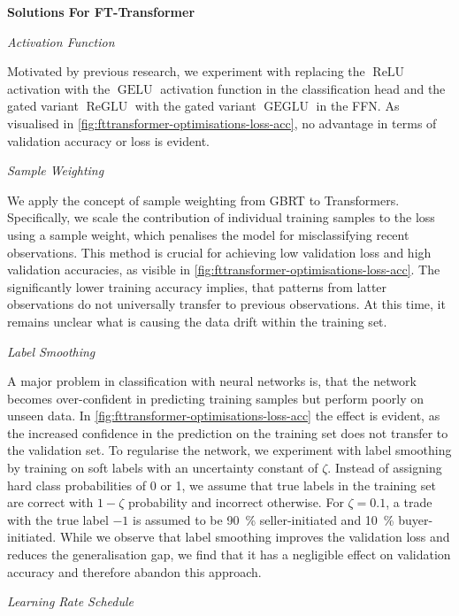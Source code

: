 \textbf{Solutions For FT-Transformer}

\emph{Activation Function}

Motivated by previous research, we experiment with replacing the $\operatorname{ReLU}$ activation with the $\operatorname{GELU}$ activation function \autocite[][2]{hendrycksGaussianErrorLinear2020} in the classification head and the gated variant $\operatorname{ReGLU}$ with the gated variant $\operatorname{GEGLU}$ \autocite[][2]{shazeerGLUVariantsImprove2020} in the \gls{FFN}. As visualised in \cref{fig:fttransformer-optimisations-loss-acc}, no advantage in terms of validation accuracy or loss is evident.

\emph{Sample Weighting}

We apply the concept of sample weighting from \gls{GBRT} to Transformers. Specifically, we scale the contribution of individual training samples to the loss using a sample weight, which penalises the model for misclassifying recent observations. This method is crucial for achieving low validation loss and high validation accuracies, as visible in \cref{fig:fttransformer-optimisations-loss-acc}. The significantly lower training accuracy implies, that patterns from latter observations do not universally transfer to previous observations. At this time, it remains unclear what is causing the data drift within the training set.

\emph{Label Smoothing}

A major problem in classification with neural networks is, that the network becomes over-confident in predicting training samples but perform poorly on unseen data. In \cref{fig:fttransformer-optimisations-loss-acc} the effect is evident, as the increased confidence in the prediction on the training set does not transfer to the validation set. To regularise the network, we experiment with label smoothing \autocite[][2823]{szegedyRethinkingInceptionArchitecture2016} by training on soft labels with an uncertainty constant of $\zeta$. Instead of assigning hard class probabilities of 0 or 1, we assume that true labels in the training set are correct with $1-\zeta$ probability and incorrect otherwise. For $\zeta=\num{0.1}$, a trade with the true label $-1$ is assumed to be \SI{90}{\percent} seller-initiated and \SI{10}{\percent} buyer-initiated. While we observe that label smoothing improves the validation loss and reduces the generalisation gap, we find that it has a negligible effect on validation accuracy and therefore abandon this approach.

\emph{Learning Rate Schedule}


